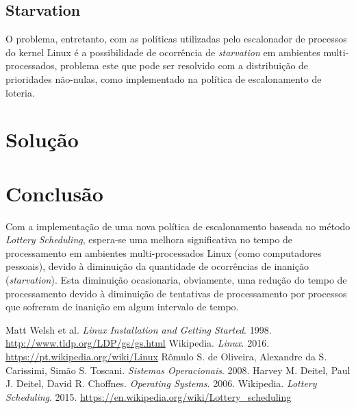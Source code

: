 \documentclass[a4paper,12pt]{article}
\begin{document}
\subsection{Starvation}
O problema, entretanto, com as políticas utilizadas pelo escalonador de processos do kernel Linux é a possibilidade de ocorrência de \emph{starvation} em ambientes multi-processados, problema este que pode ser resolvido com a distribuição de prioridades não-nulas, como implementado na política de escalonamento de loteria\cite{LSWikipedia2015}.

\section{Solução}

\section{Conclusão}
Com a implementação de uma nova política de escalonamento baseada no método \emph{Lottery Scheduling}, espera-se uma melhora significativa no tempo de processamento em ambientes multi-processados Linux (como computadores pessoais), devido à diminuição da quantidade de ocorrências de inanição (\emph{starvation}). Esta diminuição ocasionaria, obviamente, uma redução do tempo de processamento devido à diminuição de tentativas de processamento por processos que sofreram de inanição em algum intervalo de tempo.

\begin{thebibliography}{9}
 Matt Welsh et al. \emph{Linux Installation and Getting Started}. 1998. \url{http://www.tldp.org/LDP/gs/gs.html}
 Wikipedia. \emph{Linux}. 2016. \url{https://pt.wikipedia.org/wiki/Linux}
 Rômulo S. de Oliveira, Alexandre da S. Carissimi, Simão S. Toscani. \emph{Sistemas Operacionais}. 2008.
 Harvey M. Deitel, Paul J. Deitel, David R. Choffnes. \emph{Operating Systems}. 2006.
 Wikipedia. \emph{Lottery Scheduling}. 2015. \url{https://en.wikipedia.org/wiki/Lottery_scheduling}
\end{thebibliography}
\end{document}
